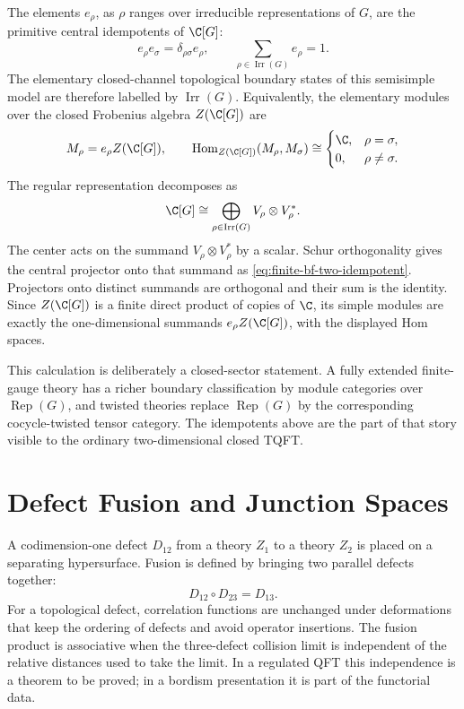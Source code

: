 The elements \(e_\rho\), as \(\rho\) ranges over irreducible representations
of \(G\), are the primitive central idempotents of \(\C[G]\):
\[
  e_\rho e_\sigma=\delta_{\rho\sigma}e_\rho,
  \qquad
  \sum_{\rho\in\operatorname{Irr}(G)}e_\rho=1 .
\]
The elementary closed-channel topological boundary states of this semisimple
model are therefore labelled by \(\operatorname{Irr}(G)\).  Equivalently, the
elementary modules over the closed Frobenius algebra \(Z(\C[G])\) are
\[
  M_\rho=e_\rho Z(\C[G]),
  \qquad
  \operatorname{Hom}_{Z(\C[G])}(M_\rho,M_\sigma)
  \cong
  \begin{cases}
  \C, & \rho=\sigma,\\
  0, & \rho\ne\sigma .
  \end{cases}
\]
The regular representation decomposes as
\[
  \C[G]\cong \bigoplus_{\rho\in\operatorname{Irr}(G)}
  V_\rho\otimes V_\rho^* .
\]
The center acts on the summand \(V_\rho\otimes V_\rho^*\) by a scalar.
Schur orthogonality gives the central projector onto that summand as
\eqref{eq:finite-bf-two-idempotent}.  Projectors onto distinct summands are
orthogonal and their sum is the identity.  Since \(Z(\C[G])\) is a finite
direct product of copies of \(\C\), its simple modules are exactly the
one-dimensional summands \(e_\rho Z(\C[G])\), with the displayed Hom spaces.

This calculation is deliberately a closed-sector statement.  A fully extended
finite-gauge theory has a richer boundary classification by module categories
over \(\operatorname{Rep}(G)\), and twisted theories replace
\(\operatorname{Rep}(G)\) by the corresponding cocycle-twisted tensor
category.  The idempotents above are the part of that story visible to the
ordinary two-dimensional closed TQFT.

\section{Defect Fusion and Junction Spaces}

A codimension-one defect \(D_{12}\) from a theory \(Z_1\) to a theory \(Z_2\)
is placed on a separating hypersurface.  Fusion is defined by bringing two
parallel defects together:
\[
  D_{12}\circ D_{23}=D_{13}.
\]
For a topological defect, correlation functions are unchanged under
deformations that keep the ordering of defects and avoid operator insertions.
The fusion product is associative when the three-defect collision limit is
independent of the relative distances used to take the limit.  In a
regulated QFT this independence is a theorem to be proved; in a bordism
presentation it is part of the functorial data.

